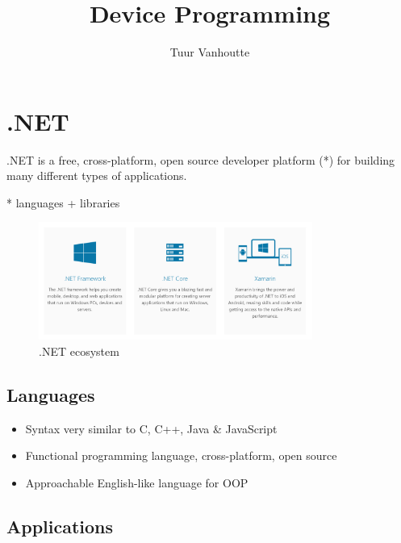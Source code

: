 \documentclass{article}
\begin{document}
\begin{titlepage}
    \author{Tuur Vanhoutte}
    \title{Device Programming}
\end{titlepage}

\maketitle
\newpage
\tableofcontents
\newpage


\section{.NET}

.NET is a free, cross-platform, open source developer platform (*) for building many different types of applications.

* languages + libraries

\begin{figure}[H]
    \centering
    \includegraphics[width=0.8\textwidth]{net-ecosystem.png}
    \caption{.NET ecosystem}
\end{figure}

\subsection{Languages}

\begin{itemize}
    \item Syntax very similar to C, C++, Java \& JavaScript
    \item Functional programming language, cross-platform, open source
    \item Approachable English-like language for OOP
\end{itemize}

\subsection{Applications}
\end{document}
